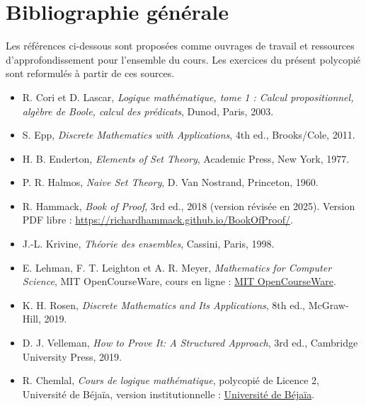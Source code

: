 \chapter*{Bibliographie générale}
Les références ci-dessous sont proposées comme ouvrages de travail et ressources d'approfondissement pour l'ensemble du cours. Les exercices du présent polycopié sont reformulés à partir de ces sources.
\begin{itemize}[leftmargin=0pt,label={},itemsep=9pt]
\item R. Cori et D. Lascar, \emph{Logique mathématique, tome 1 : Calcul propositionnel, algèbre de Boole, calcul des prédicats}, Dunod, Paris, 2003.
\item S. Epp, \emph{Discrete Mathematics with Applications}, 4th ed., Brooks/Cole, 2011.
\item H. B. Enderton, \emph{Elements of Set Theory}, Academic Press, New York, 1977.
\item P. R. Halmos, \emph{Naive Set Theory}, D. Van Nostrand, Princeton, 1960.
\item R. Hammack, \emph{Book of Proof}, 3rd ed., 2018 (version révisée en 2025). Version PDF libre : \url{https://richardhammack.github.io/BookOfProof/}.
\item J.-L. Krivine, \emph{Théorie des ensembles}, Cassini, Paris, 1998.
\item E. Lehman, F. T. Leighton et A. R. Meyer, \emph{Mathematics for Computer Science}, MIT OpenCourseWare, cours en ligne : \href{https://ocw.mit.edu/courses/6-1200j-mathematics-for-computer-science-spring-2024/}{MIT OpenCourseWare}.
\item K. H. Rosen, \emph{Discrete Mathematics and Its Applications}, 8th ed., McGraw-Hill, 2019.
\item D. J. Velleman, \emph{How to Prove It: A Structured Approach}, 3rd ed., Cambridge University Press, 2019.
\item R. Chemlal, \emph{Cours de logique mathématique}, polycopié de Licence 2, Université de Béjaïa, version institutionnelle : \href{https://elearning.univ-bejaia.dz/pluginfile.php/503483/mod_resource/content/0/Cours_CHEMLAL%20Rezki_Logique%20Math%C3%A9matique.pdf}{Université de Béjaïa}.
\end{itemize}
